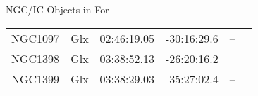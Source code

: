 \begin{block}{NGC/IC Objects in For}
  \centering
  \begin{tabularx}{\textwidth}{llrrll} 
    NGC1097 & Glx & 02:46:19.05 & -30:16:29.6  & -- \\ 
    NGC1398 & Glx & 03:38:52.13 & -26:20:16.2  & -- \\ 
    NGC1399 & Glx & 03:38:29.03 & -35:27:02.4  & -- \\ 
  \end{tabularx}
\end{block}